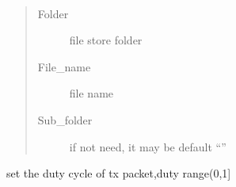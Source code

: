 \documentclass[letterpaper,10pt,english]{sphinxhowto}
\begin{document}
\begin{fulllineitems}

\begin{fulllineitems}
\label{\detokenize{rflib/index:wifi_lib.WIFILIB.esp_tx}}
\end{fulllineitems}


\begin{fulllineitems}
\label{\detokenize{rflib/index:wifi_lib.WIFILIB.force_tx_gain_init}}
\end{fulllineitems}


\begin{fulllineitems}
\label{\detokenize{rflib/index:wifi_lib.WIFILIB.force_txon}}
\end{fulllineitems}


\begin{fulllineitems}
\label{\detokenize{rflib/index:wifi_lib.WIFILIB.get_filename}}~\begin{quote}\begin{description}
\item[{Folder}] \leavevmode
file store folder

\item[{File\_name}] \leavevmode
file name

\item[{Sub\_folder}] \leavevmode
if not need, it may be default “”

\end{description}\end{quote}

\end{fulllineitems}


\begin{fulllineitems}
\label{\detokenize{rflib/index:wifi_lib.WIFILIB.get_length_delay_duty}}
set the duty cycle of tx packet,duty range(0,1{]}


\end{fulllineitems}
\end{fulllineitems}
\end{document}
